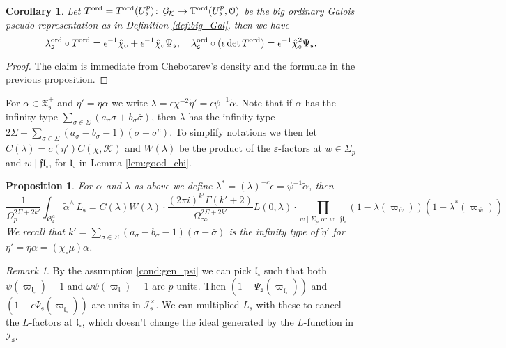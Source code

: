 \documentclass[leqno]{amsart}
\newtheorem{prop}[thm]{Proposition}
\newtheorem{cor}[thm]{Corollary}
\theoremstyle{definition}
\theoremstyle{remark}
\newtheorem{rem}[thm]{Remark}
\newcommand{\eo}{\EuScript{O}}
\DeclareMathOperator{\Gal}{\mathcal{G}}
\newcommand{\ff}{\mathfrak{f}}
\newcommand{\fl}{\mathfrak{l}}
\newcommand{\fs}{\mathfrak{s}}
\newcommand{\K}{{\mathcal{K}}} %
\newcommand{\bw}{{\overline{w}}}
\newcommand{\fG}{\mathfrak{G}}
\newcommand{\fX}{\mathfrak{X}}
\newcommand{\TT}{\mathbb{T}} %
\newcommand{\I}{\mathcal{I}} %
\newcommand{\ord}{\textnormal{ord}} %
\begin{document}
\begin{cor}\label{cor:reducible}
Let $T^{\ord}=T^{\ord}(U^p_\fs)
\colon\Gal_\K\to \TT^{\ord}(U^p_\fs,\eo)$
be the big ordinary Galois pseudo-representation
as in Definition \ref{def:big_Gal}, then we have
\begin{equation*}
    \lambda_{\fs}^{\ord}\circ T^{\ord}=
    \epsilon^{-1}\hat{\chi}_\circ+
    \epsilon^{-1}\hat{\chi}_\circ\Psi_\fs,\quad
    \lambda_{\fs}^{\ord}\circ (\epsilon \det T^{\ord})=
    \epsilon^{-1}\hat{\chi}^2_\circ\Psi_\fs.
\end{equation*}
\end{cor}
\begin{proof}
The claim is immediate from Chebotarev's density
and the formulae in the previous proposition.
\end{proof}


For $\alpha\in \fX_\fs^+$ and $\eta'=\eta\alpha$
we write $\lambda=
\epsilon \chi^{-2}\tilde{\eta}'=\epsilon\psi^{-1}\tilde{\alpha}$.
Note that if $\alpha$ has the infinity type 
$\sum_{\sigma\in\Sigma}(a_\sigma\sigma+b_\sigma\bar{\sigma})$,
then $\lambda$ has the infinity type
$2\Sigma+\sum_{\sigma\in\Sigma}(a_\sigma-b_\sigma-1)(\sigma-\sigma^c)$.
To simplify notations
we then let $C(\lambda)=c(\eta')C(\chi,\K)$
and $W(\lambda)$ be the product of the $\varepsilon$-factors
at $w\in\Sigma_p$ and $w\mid \ff\fl_\circ$,
for $\fl_\circ$ in Lemma \ref{lem:good_chi}.

\begin{prop}\label{prop:L-function_at_s}
For $\alpha$ and $\lambda$ as above we define 
$\lambda^*=(\lambda)^{-c}\epsilon=\psi^{-1}\tilde{\alpha}$, then
\begin{equation*}
	\frac{1}{\Omega_p^{2\Sigma+2k'}}
	\int_{\fG_{\fs}^a}\tilde{\alpha}^\wedge\,L_\fs=
	C(\lambda)W(\lambda)\cdot 
	\frac{(2\pi i)^{k'}\Gamma(k'+2)
	}{\Omega_\infty^{2\Sigma+2k'}}
    L(0,\lambda)\cdot
	\prod_{w\mid \Sigma_p\text{ or }w\mid\ff\fl_\circ}
	(1-\lambda(\varpi_{\bw}))
	(1-\lambda^*(\varpi_{\bw}))
\end{equation*}
We recall that 
$k'=\sum_{\sigma\in\Sigma}(a_\sigma-b_\sigma-1)(\sigma-\bar{\sigma})$
is the infinity type of $\tilde{\eta}'$
for $\eta'=\eta\alpha=(\chi_\circ\mu)\alpha$.
\end{prop}

\begin{rem}
By the assumption \eqref{cond:gen_psi}
we can pick $\fl_\circ$ 
such that both $\psi(\varpi_{\fl_\circ})-1$
and $\omega\psi(\varpi_{\fl})-1$ are $p$-units.
Then $(1-\Psi_\fs(\varpi_{\bar{\fl}_\circ}))$
and $(1-\epsilon\Psi_\fs(\varpi_{\bar{\fl}_\circ}))$
are units in $\I_\fs^\times$.
We can multiplied $L_\fs$ with these 
to cancel the $L$-factors at $\fl_\circ$,
which doesn't change the ideal generated by 
the $L$-function in $\I_\fs$.
\end{rem}
\end{document}
